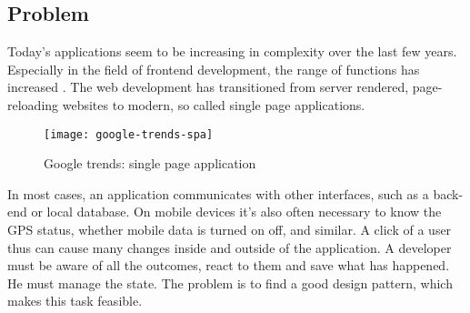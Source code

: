 \subsection{Problem}
\label{subsec:problem}

Today's applications seem to be increasing in complexity over the last few years. 
Especially in the field of frontend development, the range of functions has increased \cite{kevin2018}.
The web development has transitioned from server rendered, page-reloading websites to modern, so called single page applications.

\begin{figure}[h]
\texttt{[image: google-trends-spa]}
\centering
\caption{Google trends: single page application}
\label{fig:google-trends-spa}
\end{figure}

In most cases, an application communicates with other interfaces, such as a back-end or local database.
On mobile devices it's also often necessary to know the GPS status, whether mobile data is turned on off, and similar. 
A click of a user thus can cause many changes inside and outside of the application.
A developer must be aware of all the outcomes,  react to them and save what has happened.
He must manage the state. The problem is to find a good design pattern, which makes this task feasible.